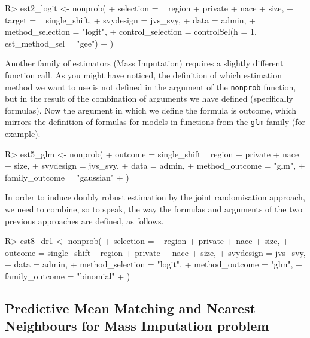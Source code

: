\documentclass[
]{jss}
\begin{document}
\begin{CodeChunk}
\begin{CodeInput}
R> est2_logit <- nonprob(
+   selection = ~ region + private + nace + size,
+   target = ~ single_shift,
+   svydesign = jvs_svy,
+   data = admin,
+   method_selection = "logit",
+   control_selection = controlSel(h = 1, est_method_sel = "gee")
+ )
\end{CodeInput}
\end{CodeChunk}

Another family of estimators (Mass Imputation) requires a slightly
different function call. As you might have noticed, the definition of
which estimation method we want to use is not defined in the argument of
the \texttt{nonprob} function, but in the result of the combination of
arguments we have defined (specifically formulas). Now the argument in
which we define the formula is outcome, which mirrors the definition of
formulas for models in functions from the \texttt{glm} family (for
example).

\begin{CodeChunk}
\begin{CodeInput}
R> est5_glm <- nonprob(
+   outcome = single_shift ~ region + private + nace + size,
+   svydesign = jvs_svy,
+   data = admin,
+   method_outcome = "glm",
+   family_outcome = "gaussian"
+ )
\end{CodeInput}
\end{CodeChunk}

In order to induce doubly robust estimation by the joint randomisation
approach, we need to combine, so to speak, the way the formulas and
arguments of the two previous approaches are defined, as follows.

\begin{CodeChunk}
\begin{CodeInput}
R> est8_dr1 <- nonprob(
+   selection = ~ region + private + nace + size,
+   outcome = single_shift ~ region + private + nace + size,
+   svydesign = jvs_svy,
+   data = admin,
+   method_selection = "logit",
+   method_outcome = "glm",
+   family_outcome = "binomial"
+ )
\end{CodeInput}
\end{CodeChunk}

\hypertarget{predictive-mean-matching-and-nearest-neighbours-for-mass-imputation-problem}{%
\subsection{Predictive Mean Matching and Nearest Neighbours for Mass
Imputation
problem}\label{predictive-mean-matching-and-nearest-neighbours-for-mass-imputation-problem}}
\end{document}
